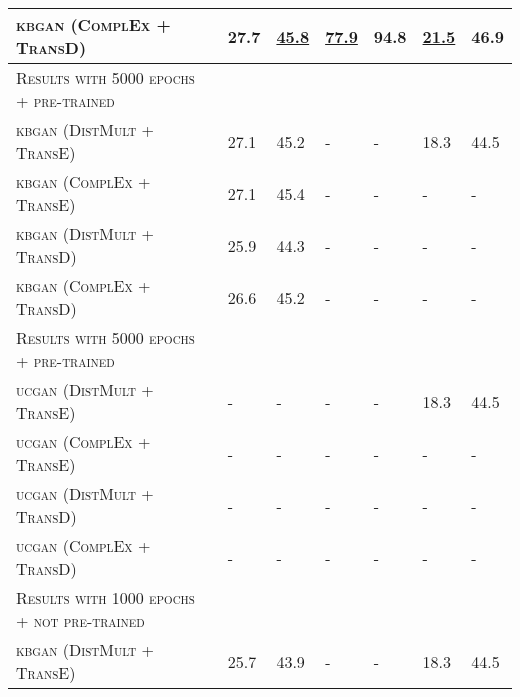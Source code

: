\begin{table}[h]
\begin{tabular}{lllllll}
        \textsc{kbgan} (\textsc{ComplEx} + \textsc{TransD})   
        & 27.7 & \textbf{\underline{45.8}} & \underline{77.9}
        & 94.8 & \underline{21.5} & 46.9\\
        
         \midrule
          
          \textsc{Results with 5000 epochs + pre-trained} 
          &  &  &  &  &  & \\
          
          \textsc{kbgan} (\textsc{DistMult} + \textsc{TransE})  & 27.1  & 45.2 & - & - & 18.3 & 44.5 \\
          
          \textsc{kbgan} (\textsc{ComplEx} + \textsc{TransE})  & 27.1  & 45.4 & - & - & - & - \\
          
          \textsc{kbgan} (\textsc{DistMult} + \textsc{TransD})  & 25.9  & 44.3 & - & - & - & - \\

          \textsc{kbgan} (\textsc{ComplEx} + \textsc{TransD})  & 26.6 & 45.2 & - & - & - & - \\
          
          \midrule
          
          \textsc{Results with 5000 epochs + pre-trained} 
          &  &  &  &  &  & \\
          
          \textsc{ucgan} (\textsc{DistMult} + \textsc{TransE})  & - & - & - & - & 18.3 & 44.5 \\
          
          \textsc{ucgan} (\textsc{ComplEx} + \textsc{TransE})  & -  & - & - & - & - & - \\
          
          \textsc{ucgan} (\textsc{DistMult} + \textsc{TransD})  & -  & - & - & - & - & - \\

          \textsc{ucgan} (\textsc{ComplEx} + \textsc{TransD})  & -  & - & - & - & - & - \\
          
          \midrule
        \textsc{Results with 1000 epochs + not pre-trained} 
          &  &  &  &  &  & \\
          
          \textsc{kbgan} (\textsc{DistMult} + \textsc{TransE})  & 25.7 & 43.9 & - & - & 18.3 & 44.5 \\
          

\end{tabular}
\end{table}
